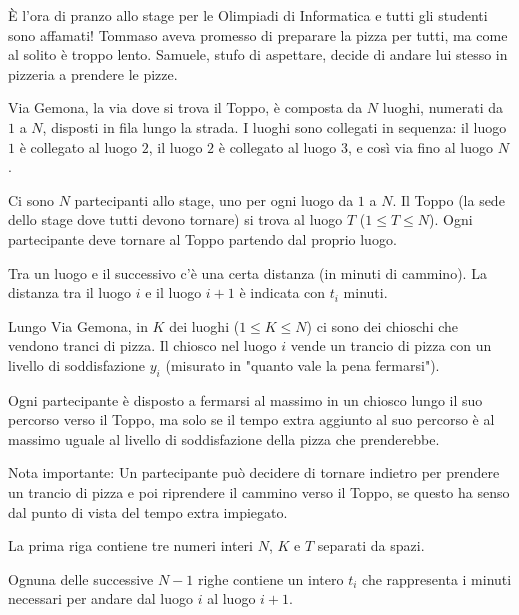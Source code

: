 \usepackage{xcolor}
\usepackage{afterpage}
\usepackage{pifont,mdframed}
\usepackage[bottom]{footmisc}

\newcommand{\inputfile}{\texttt{stdin}}
\newcommand{\outputfile}{\texttt{stdout}}
\makeatletter
\renewcommand{\this@inputfilename}{\texttt{stdin}}
\renewcommand{\this@outputfilename}{\texttt{stdout}}
\makeatother

È l'ora di pranzo allo stage per le Olimpiadi di Informatica e tutti gli studenti sono affamati! Tommaso aveva promesso di preparare la pizza per tutti, ma come al solito è troppo lento. Samuele, stufo di aspettare, decide di andare lui stesso in pizzeria a prendere le pizze.

Via Gemona, la via dove si trova il Toppo, è composta da $N$ luoghi, numerati da $1$ a $N$, disposti in fila lungo la strada. I luoghi sono collegati in sequenza: il luogo $1$ è collegato al luogo $2$, il luogo $2$ è collegato al luogo $3$, e così via fino al luogo $N$.

Ci sono $N$ partecipanti allo stage, uno per ogni luogo da $1$ a $N$. Il Toppo (la sede dello stage dove tutti devono tornare) si trova al luogo $T$ ($1 \le T \le N$). Ogni partecipante deve tornare al Toppo partendo dal proprio luogo.

Tra un luogo e il successivo c'è una certa distanza (in minuti di cammino). La distanza tra il luogo $i$ e il luogo $i+1$ è indicata con $t_i$ minuti.

Lungo Via Gemona, in $K$ dei luoghi ($1 \le K \le N$) ci sono dei chioschi che vendono tranci di pizza. Il chiosco nel luogo $i$ vende un trancio di pizza con un livello di soddisfazione $y_i$ (misurato in "quanto vale la pena fermarsi").

Ogni partecipante è disposto a fermarsi al massimo in un chiosco lungo il suo percorso verso il Toppo, ma solo se il tempo extra aggiunto al suo percorso è al massimo uguale al livello di soddisfazione della pizza che prenderebbe.

Nota importante: Un partecipante può decidere di tornare indietro per prendere un trancio di pizza e poi riprendere il cammino verso il Toppo, se questo ha senso dal punto di vista del tempo extra impiegato.


\InputFile
La prima riga contiene tre numeri interi $N$, $K$ e $T$ separati da spazi.

Ognuna delle successive $N-1$ righe contiene un intero $t_i$ che rappresenta i minuti necessari per andare dal luogo $i$ al luogo $i+1$.

